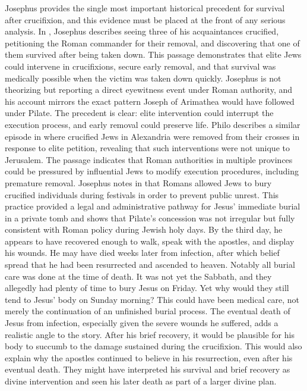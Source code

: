 Josephus provides the single most important historical precedent for survival after crucifixion, and this evidence must be placed at the front of any serious analysis.
In \cite[420--421]{josephus:life}, Josephus describes seeing three of his acquaintances crucified, petitioning the Roman commander for their removal, and discovering that one of them survived after being taken down.
This passage demonstrates that elite Jews could intervene in crucifixions, secure early removal, and that survival was medically possible when the victim was taken down quickly.
Josephus is not theorizing but reporting a direct eyewitness event under Roman authority, and his account mirrors the exact pattern Joseph of Arimathea would have followed under Pilate.
The precedent is clear: elite intervention could interrupt the execution process, and early removal could preserve life.
Philo describes a similar episode in \cite[83--84]{philo:flaccum} where crucified Jews in Alexandria were removed from their crosses in response to elite petition, revealing that such interventions were not unique to Jerusalem.
The passage indicates that Roman authorities in multiple provinces could be pressured by influential Jews to modify execution procedures, including premature removal.
Josephus notes in \cite[4.317]{josephus:war} that Romans allowed Jews to bury crucified individuals during festivals in order to prevent public unrest.
This practice provided a legal and administrative pathway for Jesus' immediate burial in a private tomb and shows that Pilate's concession was not irregular but fully consistent with Roman policy during Jewish holy days.
By the third day, he appears to have recovered enough to walk, speak with the apostles, and display his wounds.
He may have died weeks later from infection, after which belief spread that he had been resurrected and ascended to heaven.
Notably all burial care was done at the time of death.
It was not yet the Sabbath, and they allegedly had plenty of time to bury Jesus on Friday.
Yet why would they still tend to Jesus' body on Sunday morning?
This could have been medical care, not merely the continuation of an unfinished burial process.
The eventual death of Jesus from infection, especially given the severe wounds he suffered, adds a realistic angle to the story.
After his brief recovery, it would be plausible for his body to succumb to the damage sustained during the crucifixion.
This would also explain why the apostles continued to believe in his resurrection, even after his eventual death.
They might have interpreted his survival and brief recovery as divine intervention and seen his later death as part of a larger divine plan.

